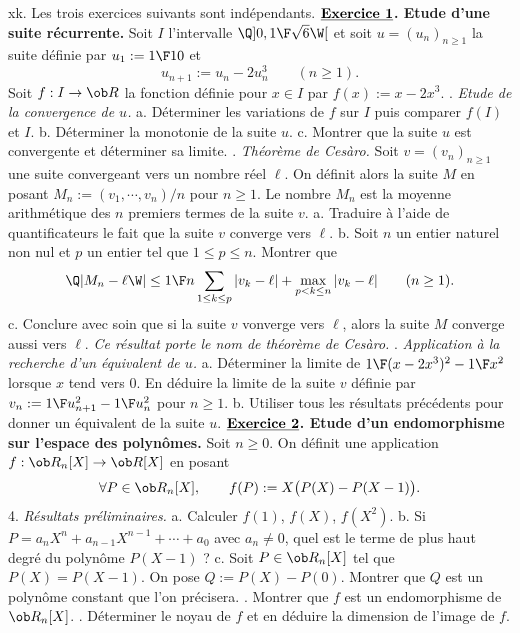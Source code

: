 \exo [Origin=Deug06,Level=1,Fight=1,Learn=2,Type=\Problèmes,Field=\Suites|\Matrices|EquationsDifférentielles,Indication={3b) On pourra simplifier $\sum_{1\le k\le n}v_k$.}] xk. 
Les trois exercices suivants sont indépendants. \pn
$\underline{\hbox{\bf Exercice 1}}${\bf. Etude d'une suite récurrente. }\pn
 Soit $I$ l'intervalle $\Q]0,{1\F\sqrt6}\W[$ et soit $u=(u_n)_{n\ge1}$ la suite définie par $u_1:={1\F 10}$ et
$$
u_{n+1}:=u_n-2u_n^3\qquad(n\ge1).
$$ 
Soit $f:I\to\ob R$ la fonction définie pour $x\in I$ par $f(x):=x-2x^3$. . {\it Etude de la convergence de $u$. }\pn
a. Déterminer les variations de $f$ sur $I$ puis comparer $f(I)$ et $I$. \pn
b. Déterminer la monotonie de la suite $u$. \pn
c. Montrer que la suite $u$ est convergente et déterminer sa limite. 
\medskip{}. {\it Théorème de Cesàro. }\pn
Soit $v=(v_n)_{n\ge1}$ une suite convergeant vers un nombre réel $\ell$. \pn
On définit alors la suite $M$ en posant $M_n:=(v_1,\cdots,v_n)/n$ pour $n\ge1$. 
Le nombre $M_n$ est la moyenne arithmétique des $n$ premiers termes de la suite $v$. \pn
a. Traduire à l'aide de quantificateurs le fait que la suite $v$ converge vers $\ell$. \pn
b. Soit $n$ un entier naturel non nul et $p$ un entier tel que $1\le p\le n$. Montrer que 
$$
\Q|M_n-\ell\W|\le{1\F n}\sum_{1\le k\le p}|v_k-\ell|+\max_{p< k\le n}|v_k-\ell|\qquad (n\ge1). 
$$
c. Conclure avec soin que si la suite $v$ vonverge vers $\ell$, alors la suite $M$ converge aussi vers $\ell$. 
{\it Ce résultat porte le nom de théorème de Cesàro. }\medskip{}. {\it Application à la recherche d'un équivalent de $u$. }\pn
a. Déterminer la limite de ${1\F(x-2x^3)^2}-{1\F x^2}$ lorsque $x$ tend vers $0$. \pn
En déduire la limite de la suite $v$ définie par $v_n:={1\F u_{n+1}^2}-{1\F u_n^2}$ pour $n\ge1$. \pn
b. Utiliser tous les résultats précédents pour donner un équivalent de la suite $u$. \medskip\noindent
$\underline{\hbox{\bf Exercice 2}}${\bf .  Etude d'un endomorphisme sur l'espace des polynômes. }\pn
Soit $n\ge0$. On définit une application $f:\ob R_n[X]\to\ob R[X]$ en posant 
$$
\forall P\in\ob R_n[X], \qquad f(P):=X\big(P(X)-P(X-1)\big).
$$
4. {\it Résultats préliminaires. }\pn
a. Calculer $f(1)$, $f(X)$, $f(X^2)$. \pn
b. Si $P=a_nX^n+a_{n-1}X^{n-1}+\cdots+a_0$ avec $a_n\neq0$, quel est le terme de plus haut degré du polynôme $P(X-1)$ ?\pn
c. Soit $P\in\ob R_n[X]$ tel que $P(X)=P(X-1)$. On pose $Q:=P(X)-P(0)$. Montrer que $Q$ est un polynôme constant que l'on précisera. \medskip{}. Montrer que $f$ est un endomorphisme de $\ob R_n[X]$. \medskip{}. Déterminer le noyau de $f$ et en déduire la dimension de l'image de $f$. \medskip\noindent
